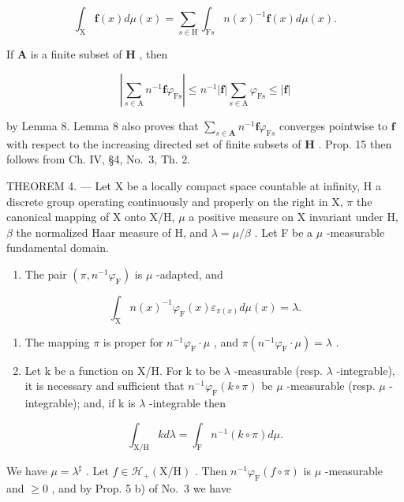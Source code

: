 \[
\int_ {\mathrm{X}} \mathbf {f} (x) d \mu (x) = \sum_ {s \in \mathrm{H}} \int_ {\mathrm{F} s} n (x) ^ {- 1} \mathbf {f} (x) d \mu (x).
\]

If \(\mathbf{A}\) is a finite subset of \(\mathbf{H}\) , then

\[
\left| \sum_ {s \in \mathrm{A}} n ^ {- 1} \mathbf {f} \varphi_ {\mathrm{Fs}} \right| \leqslant n ^ {- 1} | \mathbf {f} | \sum_ {s \in \mathrm{A}} \varphi_ {\mathrm{Fs}} \leqslant | \mathbf {f} |
\]

by Lemma 8. Lemma 8 also proves that \(\sum_{s\in\mathbf{A}}n^{-1}\mathbf{f}\varphi_{\mathrm{F}s}\) converges pointwise to \(\mathbf{f}\) with respect to the increasing directed set of finite subsets of \(\mathbf{H}\) . Prop. 15 then follows from Ch. IV, §4, No.~3, Th. 2.

THEOREM 4. --- Let X be a locally compact space countable at infinity, H a discrete group operating continuously and properly on the right in X, \(\pi\) the canonical mapping of X onto X/H, \(\mu\) a positive measure on X invariant under H, \(\beta\) the normalized Haar measure of H, and \(\lambda = \mu/\beta\) . Let F be a \(\mu\) -measurable fundamental domain.

\begin{enumerate}
\def\labelenumi{\alph{enumi})}
\tightlist
\item
  The pair \((\pi, n^{-1}\varphi_{\mathrm{F}})\) is \(\mu\) -adapted, and
\end{enumerate}

\[
\int_ {\mathrm{X}} n (x) ^ {- 1} \varphi_ {\mathrm{F}} (x) \varepsilon_ {\pi (x)} d \mu (x) = \lambda .
\]

\begin{enumerate}
\def\labelenumi{\alph{enumi})}
\setcounter{enumi}{1}
\item
  The mapping \(\pi\) is proper for \(n^{-1}\varphi_{\mathrm{F}}\cdot \mu\) , and \(\pi (n^{-1}\varphi_{\mathrm{F}}\cdot \mu) = \lambda\) .
\item
  Let k be a function on X/H. For k to be \(\lambda\) -measurable (resp. \(\lambda\) -integrable), it is necessary and sufficient that \(n^{-1}\varphi_{\mathrm{F}}(k\circ\pi)\) be \(\mu\) -measurable (resp. \(\mu\) -integrable); and, if k is \(\lambda\) -integrable then
\end{enumerate}

\[
\int_ {\mathrm{X/H}} k d \lambda = \int_ {\mathrm{F}} n ^ {- 1} (k \circ \pi) d \mu .
\]

We have \(\mu = \lambda^{\sharp}\) . Let \(f \in \mathcal{H}_{+}(\mathrm{X / H})\) . Then \(n^{-1}\varphi_{\mathrm{F}}(f \circ \pi)\) is \(\mu\) -measurable and \(\geqslant 0\) , and by Prop. 5 b) of No.~3 we have

